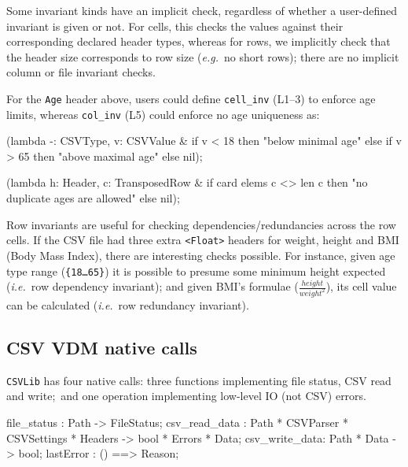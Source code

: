 \documentclass[runningheads,a4paper]{llncs}
\newcommand{\lfcomment}[1]{{\scriptsize\textcolor{red}{LF:~#1}}}  %
\begin{document}
Some invariant kinds have an implicit check, regardless of whether a user-defined invariant is given or not. For cells, this checks the values against their corresponding declared header types, whereas for rows, we implicitly check that the header size corresponds to row size (\textit{e.g.}~no short rows); there are no implicit column or file invariant checks. 

For the \texttt{Age} header above, users could define \texttt{cell\_inv} (L1--3) to enforce age limits, whereas \texttt{col\_inv} (L5) could enforce no age uniqueness as:
%
\begin{vdmsl}[frame=none,basicstyle=\ttfamily\scriptsize,numbers=left,caption={Cell and Column Invariant Definitions},label={lst:CSVInvs}]
    (lambda -: CSVType, v: CSVValue & 
        if v < 18 then "below minimal age" else
        if v > 65 then "above maximal age" else nil);

    (lambda h: Header, c: TransposedRow & 
        if card elems c <> len c then "no duplicate ages are allowed" else nil);
\end{vdmsl}
%
Row invariants are useful for checking dependencies/redundancies across the row cells. If the CSV file had three extra \texttt{<Float>} headers for weight, height and BMI (Body Mass Index), there are interesting checks possible. For instance, given age type range (\texttt{\{18\ldots 65\}}) it is possible to presume some minimum height expected (\textit{i.e.}~row dependency invariant); and given BMI's formulae (\(\frac{height}{weight^2}\)), its cell value can be calculated (\textit{i.e.}~row redundancy invariant).     


\subsection*{CSV VDM native calls}\label{subsec:VDMnative}

\texttt{CSVLib} has four native calls: three functions implementing file status, CSV read and write;~and one operation implementing low-level IO (not CSV) errors.   
%
\begin{vdmsl}[frame=none,basicstyle=\ttfamily\scriptsize]
    file_status   : Path -> FileStatus;
    csv_read_data : Path * CSVParser * CSVSettings * Headers -> 
                    bool * Errors * Data;
    csv_write_data: Path * Data -> bool;
    lastError     : () ==> Reason;
\end{vdmsl} 
\end{document}
